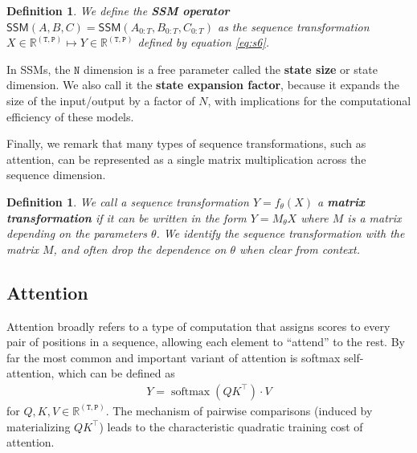 \documentclass{article}
\newtheorem{definition}[theorem]{Definition}
\newcommand{\R}{\mathbb{R}}
\begin{document}
\begin{definition}
  \label{def:ssm}
  We define the \textbf{SSM operator}
    $\mathsf{SSM}(A, B, C) = \mathsf{SSM}(A_{0:T}, B_{0:T}, C_{0:T})$ as the sequence transformation $X \in \R^{\mathtt{(T,P)}} \mapsto Y \in \R^{\mathtt{(T,P)}}$
    defined by equation \eqref{eq:s6}.
\end{definition}

In SSMs, the $\mathtt{N}$ dimension is a free parameter called the \textbf{state size} or state dimension.
We also call it the \textbf{state expansion factor}, because it expands the size of the input/output by a factor of $N$, with implications for the computational efficiency of these models.

Finally, we remark that many types of sequence transformations, such as attention, can be represented as a single matrix multiplication across the sequence dimension.
\begin{definition}
  \label{def:matrix-transformation}
  We call a sequence transformation $Y = f_\theta(X)$ a \textbf{matrix transformation} if it can be written in the form $Y = M_\theta X$ where $M$ is a matrix depending on the parameters $\theta$.
  We identify the sequence transformation with the matrix $M$, and often drop the dependence on $\theta$ when clear from context.
\end{definition}

\subsection{Attention}
\label{sec:overview:attention}

Attention broadly refers to a type of computation that assigns scores to every pair of positions in a sequence, allowing each element to ``attend'' to the rest.
By far the most common and important variant of attention is softmax self-attention, which can be defined as
\begin{align*}
  Y = \operatorname*{softmax}(QK^{\top}) \cdot V
\end{align*}
for $Q, K, V \in \R^{\mathtt{(T,P)}}$.
The mechanism of pairwise comparisons (induced by materializing $QK^{\top}$) leads to the characteristic quadratic training cost of attention.
\end{document}
